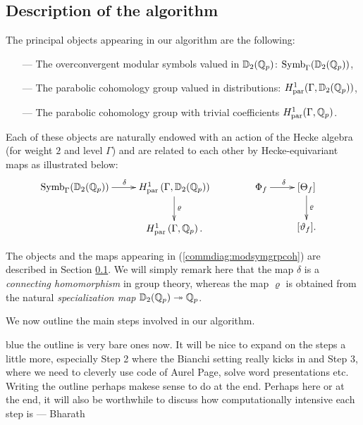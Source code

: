 \documentclass[a4paper,11pt]{article}
\newcommand{\BP}[1]{
	\begin{color}{blue}
		\marginpar{$\heartsuit$} #1
		--- Bharath
	\end{color}
}
\numberwithin{equation}{section}
\newcommand{\Par}{\mathrm{par}}
\begin{document}
\subsection{Description of the algorithm}

The principal objects appearing in our algorithm are the following:

\begin{itemize}
\item [---] The overconvergent modular symbols valued in $\mathbb{D}_2(\mathbb{Q}_p)$: $\mathrm{Symb}_\Gamma(\mathbb{D}_2(\mathbb{Q}_p))$,
\item[---] The parabolic cohomology group valued in distributions: $H^1_{\Par}(\Gamma,\D_2(\Q_p))$,
\item[---] The parabolic cohomology group with trivial coefficients $H^1_{\Par}(\Gamma,\Q_p)$.
\end{itemize}

Each of these objects are naturally endowed with an action of the  Hecke algebra (for weight $2$ and level $\Gamma$) and are related to each other by Hecke-equivariant maps as illustrated below:
\begin{align} \label{commdiag:modsymgrpcoh}
\xymatrix{
\Symb_{\Gamma}(\D_2(\Q_p)) \ar[r]^{\delta}&  H^1_{\Par}\left(\Gamma,\D_2(\Q_p)\right) \ar[d]^{\varrho} \\
& H^1_{\Par}\left(\Gamma,\Q_p \right).
} & \qquad \qquad
\xymatrix{
{\Phi}_{f} \ar[r]^{\delta}&  [\Theta_{f}] \ar[d]^{\varrho} \\
& [\vartheta_{f}].
}
\end{align}



The objects and the maps appearing in (\ref{commdiag:modsymgrpcoh}) are described in Section \ref{}. We will simply remark here that the map $\delta$ is a \textit{connecting homomorphism} in group theory, whereas the map $\varrho$ is obtained from the natural \textit{specialization map} $\mathbb{D}_2(\mathbb{Q}_p) \twoheadrightarrow \mathbb{Q}_p$.

We now outline the main steps involved in our algorithm.\BP{the outline is very bare ones now. It will be nice to expand on the steps a little more, especially Step 2 where the Bianchi setting really kicks in and Step 3, where we need to cleverly use code of Aurel Page, solve word presentations etc. Writing the outline perhaps makese sense to do at the end. Perhaps here or at the end, it will also be worthwhile to discuss how computationally intensive each step is}
\end{document}
